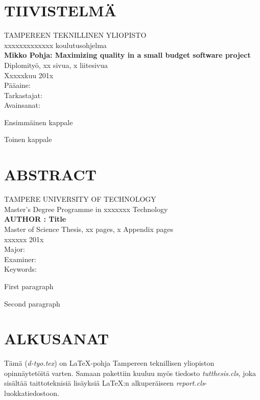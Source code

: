 ﻿\documentclass[12pt,a4paper,finnish]{tutthesis}
\begin{document}
\setcounter{page}{1} %
 
\chapter*{TIIVISTELMÄ}
\begin{spacing}{1.0}
\textsf{TAMPEREEN TEKNILLINEN YLIOPISTO}\\
\textsf{xxxxxxxxxxxxx koulutusohjelma}\\
{\bf \textsf{Mikko Pohja: Maximizing quality in a small budget software project}}\\
\textsf{Diplomityö, xx sivua, x liitesivua}\\
\textsf{Xxxxxkuu 201x}\\
\textsf{Pääaine: }\\
\textsf{Tarkastajat: }\\
\textsf{Avainsanat: }\\
\end{spacing}
 
\noindent
Ensimmäinen kappale
 
\noindent
Toinen kappale
\newpage
\chapter*{ABSTRACT}
\begin{spacing}{1.0}
\textsf{TAMPERE UNIVERSITY OF TECHNOLOGY}\\
\textsf{Master's Degree Programme in xxxxxxx Technology}\\
{\bf \textsf{AUTHOR : Title}}\\
\textsf{Master of Science Thesis, xx pages, x Appendix pages}\\
\textsf{xxxxxx 201x}\\
\textsf{Major: }\\
\textsf{Examiner: }\\
\textsf{Keywords: }\\
\end{spacing}
 
\noindent 
First paragraph
 
\noindent
Second paragraph
 
\newpage
 
\chapter*{ALKUSANAT}
\noindent Tämä (\textit{d-tyo.tex}) on \LaTeX-pohja Tampereen teknillisen
yliopiston opinnäytetöitä varten. Samaan pakettiin kuuluu myös
tiedosto \mbox{\textit{tutthesis.cls}}, joka sisältää taittoteknisiä
lisäyksiä \LaTeX:n alkuperäiseen \textit{report.cls}-luokkatiedostoon.
 
\end{document}
